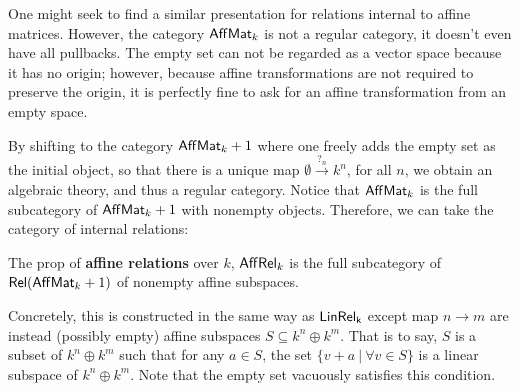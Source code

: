 One might seek to find a similar presentation for relations internal to affine matrices.
However, the category $\mathsf{Aff}\mathsf{Mat}_k$ is not a regular category, it doesn't even have all pullbacks.
The empty set can not be regarded as a vector space because it has no origin; however, because affine transformations are not required to preserve the origin, it is perfectly fine to ask for an affine transformation from an empty space.


By shifting to the category $\mathsf{Aff}\mathsf{Mat}_k+1$ where one freely adds the empty set as the initial object, so that there is a unique map $\emptyset \xrightarrow{?_n} k^n$, for all $n$,  we obtain an algebraic theory, and thus a regular category.  Notice that $\mathsf{Aff}\mathsf{Mat}_k$ is the full subcategory of $\mathsf{Aff}\mathsf{Mat}_k+1$ with nonempty objects.  Therefore, we can take the category of internal relations:
\begin{definition}
The prop of {\bf affine relations} over $k$, $\mathsf{Aff}\mathsf{Rel}_{k}$ is the full subcategory of  $\mathsf{Rel}(\mathsf{Aff}\mathsf{Mat}_k+1)$ of nonempty affine subspaces.
\end{definition}
Concretely, this is constructed in the same way as $\sf LinRel_k$ except map $n\to m$ are instead (possibly empty) affine subspaces $S \subseteq k^n\oplus k^m$. That is to say, $S$ is a subset of $k^n\oplus k^m$ such that for any $a \in S$, the set $\{v+a\ |\ \forall v \in S\}$ is a linear subspace of  $k^n\oplus k^m$.  Note that the empty set vacuously satisfies this condition.


